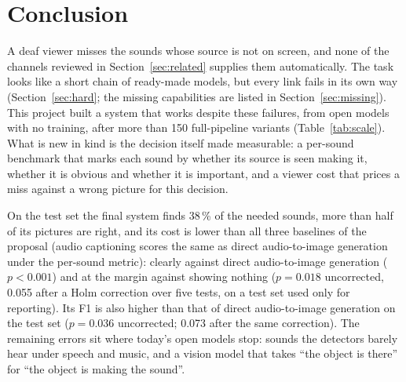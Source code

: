 \section{Conclusion}\label{sec:conclusion}

A deaf viewer misses the sounds whose source is not on screen, and none of the channels reviewed in
Section~\ref{sec:related} supplies them automatically.
The task looks like a short chain of ready-made models, but every link fails in its own way
(Section~\ref{sec:hard}; the missing capabilities are listed in Section~\ref{sec:missing}). This project built a system that works despite these failures, from open models with no
training, after more than 150 full-pipeline variants (Table~\ref{tab:scale}). What is new in kind is the decision
itself made measurable: a per-sound benchmark that marks each sound by whether its source is seen making it, whether it is
obvious and whether it is important, and a viewer cost that prices a miss against a wrong picture for this decision.

On the test set the final system
finds 38\,\% of the needed sounds, more than half of its pictures are right, and its cost is lower than all three baselines of the
proposal (audio captioning scores the same as direct audio-to-image generation under the per-sound metric): clearly against
direct audio-to-image generation ($p < 0.001$) and at the margin against showing nothing ($p = 0.018$ uncorrected, 0.055 after a Holm
correction over five tests, on a test set used only for reporting). Its F1 is also higher than that of direct
audio-to-image generation on the test set ($p = 0.036$ uncorrected; 0.073 after the same correction). The remaining errors sit where today's open models stop: sounds the detectors barely hear under speech and
music, and a vision model that takes ``the object is there'' for ``the object is making the sound''.

